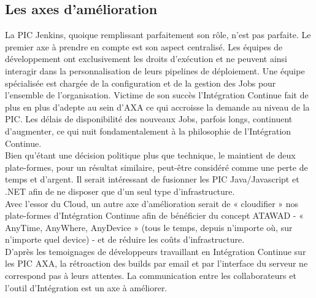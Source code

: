     \subsection{Les axes d'amélioration}
    La PIC Jenkins, quoique remplissant parfaitement son rôle, n'est pas parfaite. Le premier axe à prendre en compte est son aspect centralisé. Les équipes de développement ont exclusivement les droits d'exécution et ne peuvent ainsi interagir dans la personnalisation de leurs pipelines de déploiement. Une équipe spécialisée est chargée de la configuration et de la gestion des Jobs pour l'ensemble de l'organisation. Victime de son succès l'Intégration Continue fait de plus en plus d'adepte au sein d'AXA ce qui accroisse la demande au niveau de la PIC. Les délais de disponibilité des nouveaux Jobs, parfois longs, continuent d'augmenter, ce qui nuit fondamentalement à la philosophie de l'Intégration Continue.\\

    Bien qu'étant une décision politique plus que technique, le maintient de deux plate-formes, pour un résultat similaire, peut-être considéré comme une perte de temps et d'argent. Il serait intéressant de fusionner les PIC Java/Javascript et .NET afin de ne disposer que d'un seul type d'infrastructure. \\

    Avec l'essor du Cloud, un autre axe d'amélioration serait de « cloudifier » nos plate-formes d'Intégration Continue afin de bénéficier du concept ATAWAD - « AnyTime, AnyWhere, AnyDevice » (tous le temps, depuis n'importe où, sur n'importe quel device) - et de réduire les coûts d'infrastructure.\\

    D'après les temoignages de développeurs travaillant en Intégration Continue sur les PIC AXA, la rétroaction des builds par email et par l'interface du serveur ne correspond pas à leurs attentes. La communication entre les collaborateurs et l'outil d'Intégration est un axe à améliorer.
